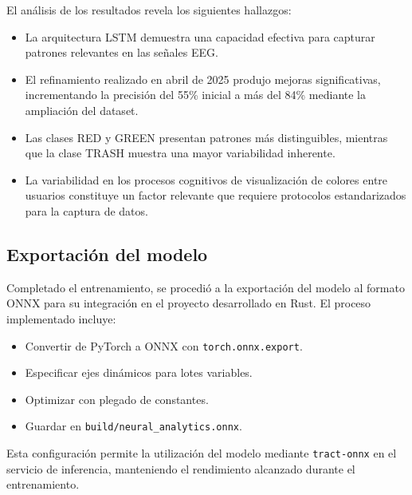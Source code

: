 El análisis de los resultados revela los siguientes hallazgos:

\begin{itemize}
    \item La arquitectura LSTM demuestra una capacidad efectiva para capturar patrones relevantes en las señales EEG.
    
    \item El refinamiento realizado en abril de 2025 produjo mejoras significativas, incrementando la precisión del 55\% inicial a más del 84\% mediante la ampliación del dataset.
    
    \item Las clases RED y GREEN presentan patrones más distinguibles, mientras que la clase TRASH muestra una mayor variabilidad inherente.
    
    \item La variabilidad en los procesos cognitivos de visualización de colores entre usuarios constituye un factor relevante que requiere protocolos estandarizados para la captura de datos.
\end{itemize}

\subsection{Exportación del modelo}

Completado el entrenamiento, se procedió a la exportación del modelo al formato ONNX para su integración en el proyecto desarrollado en Rust. El proceso implementado incluye:

\begin{itemize}
    \item Convertir de PyTorch a ONNX con \texttt{torch.onnx.export}.
    \item Especificar ejes dinámicos para lotes variables.
    \item Optimizar con plegado de constantes.
    \item Guardar en \texttt{build/neural\_analytics.onnx}.
\end{itemize}

Esta configuración permite la utilización del modelo mediante \texttt{tract-onnx} en el servicio de inferencia, manteniendo el rendimiento alcanzado durante el entrenamiento.

